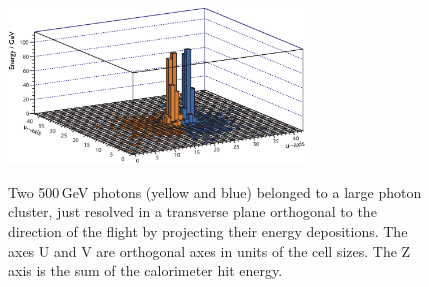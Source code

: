 




\begin{figure}[tbph]
\centering
{\includegraphics[width=0.7\textwidth]{photon/peakFindingMod}}
\caption[Example of projecting a large photon cluster containing two photons.]
{Two 500\,GeV photons (yellow and blue) belonged to  a large photon cluster, just resolved in a transverse plane orthogonal to the direction of the flight  by projecting their energy depositions. The axes U and V are orthogonal axes in units of the \ECAL cell sizes. The Z axis is the sum of the calorimeter hit energy.}
\label{fig:photonPeakFinding}
\end{figure}


